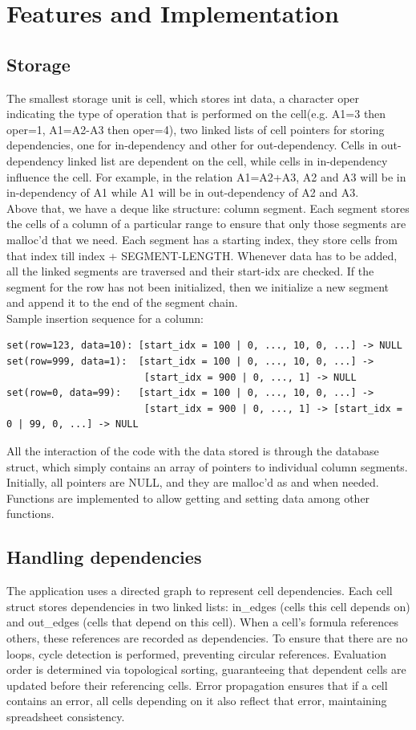 \documentclass{article}
\begin{document}
\section{Features and Implementation}
\subsection{Storage}
The smallest storage unit is cell, which stores int data, a character oper indicating the type of operation that is performed on the cell(e.g. A1=3 then oper=1, A1=A2-A3 then oper=4), two linked lists of cell pointers for storing dependencies, one for in-dependency and other for out-dependency. Cells in out-dependency linked list are dependent on the cell, while cells in in-dependency influence the cell. For example, in the relation A1=A2+A3, A2 and A3 will be in in-dependency of A1 while A1 will be in out-dependency of A2 and A3.\\
Above that, we have a deque like structure: column segment. Each segment stores the cells of a column of a particular range to ensure that only those segments are malloc'd that we need. Each segment has a starting index, they store cells from that index till index + SEGMENT-LENGTH. Whenever data has to be added, all the linked segments are traversed and their start-idx are checked. If the segment for the row has not been initialized, then we initialize a new segment and append it to the end of the segment chain.\\
Sample insertion sequence for a column:
\begin{verbatim}
set(row=123, data=10): [start_idx = 100 | 0, ..., 10, 0, ...] -> NULL
set(row=999, data=1):  [start_idx = 100 | 0, ..., 10, 0, ...] -> 
                        [start_idx = 900 | 0, ..., 1] -> NULL
set(row=0, data=99):   [start_idx = 100 | 0, ..., 10, 0, ...] -> 
                        [start_idx = 900 | 0, ..., 1] -> [start_idx = 0 | 99, 0, ...] -> NULL
\end{verbatim}
All the interaction of the code with the data stored is through the database struct, which simply contains an array of pointers to individual column segments. Initially, all pointers are NULL, and they are malloc'd as and when needed. Functions are implemented to allow getting and setting data among other functions.

\subsection{Handling dependencies}
The application uses a directed graph to represent cell dependencies. Each cell struct stores dependencies in two linked lists: in\_edges (cells this cell depends on) and out\_edges (cells that depend on this cell). When a cell's formula references others, these references are recorded as dependencies. To ensure that there are no loops, cycle detection is performed, preventing circular references. Evaluation order is determined via topological sorting, guaranteeing that dependent cells are updated before their referencing cells. Error propagation ensures that if a cell contains an error, all cells depending on it also reflect that error, maintaining spreadsheet consistency.
\end{document}
